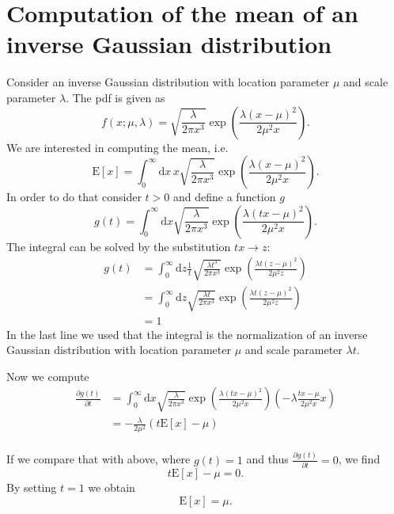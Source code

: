 \documentclass{scrreprt}
\renewcommand{\d}{{\mathrm{d}}}
\begin{document}
\chapter*{Computation of the mean of an inverse Gaussian distribution}
Consider an inverse Gaussian distribution with location parameter $\mu$ and scale parameter $\lambda$. The pdf is given as
\begin{equation*}
 f(x;\mu ,\lambda )= \sqrt{\frac{\lambda }{2\pi x^{3}}} \exp \left( \frac{\lambda (x-\mu )^{2}}{2\mu ^{2}x} \right).
\end{equation*}
We are interested in computing the mean, i.e.
\begin{equation*}
\mathrm{E}[x] = \int_{0}^{\infty}\d x\,x\sqrt{\frac{\lambda }{2\pi x^{3}}} \exp \left( \frac{\lambda (x-\mu )^{2}}{2\mu ^{2}x} \right).
\end{equation*}
In order to do that consider $t > 0$ and define a function $g$
\begin{equation*}
g(t) = \int_{0}^{\infty}\d x\sqrt{\frac{\lambda }{2\pi x^{3}}} \exp \left( \frac{\lambda (tx-\mu )^{2}}{2\mu ^{2}x} \right).
\end{equation*}
The integral can be solved by the substitution $tx \rightarrow z$:
\begin{align*}
g(t)&=\int_{0}^{\infty}\d z\frac{1}{t}\sqrt{\frac{\lambda t^3}{2\pi x^{3}}} \exp \left( \frac{\lambda t(z-\mu )^{2}}{2\mu ^{2}z} \right)\\
&=\int_{0}^{\infty}\d z\sqrt{\frac{\lambda t}{2\pi x^{3}}} \exp \left( \frac{\lambda t(z-\mu )^{2}}{2\mu ^{2}z} \right)\\
&=1
\end{align*}
In the last line we used that the integral is the normalization of an inverse Gaussian distribution with location parameter $\mu$ and scale parameter $\lambda t$.

Now we compute 
\begin{align*}
\frac{\partial g(t)}{\partial t}&=\int_{0}^{\infty}\d x\sqrt{\frac{\lambda }{2\pi x^{3}}} \exp \left( \frac{\lambda (tx-\mu )^{2}}{2\mu ^{2}x} \right)\left(- \lambda\frac{tx-\mu}{2 \mu^2 x}x\right)\\
&=-\frac{\lambda}{2 \mu^2}\left(t\mathrm{E}[x]-\mu\right)\\
\end{align*}

If we compare that with above, where $g(t) = 1 $ and thus  $\frac{\partial g(t)}{\partial t}=0$, we find
\begin{equation*}
t\mathrm{E}[x]-\mu = 0.
\end{equation*}
By setting $t = 1$ we obtain
\begin{equation*}
\mathrm{E}[x] = \mu.
\end{equation*}
\end{document}
